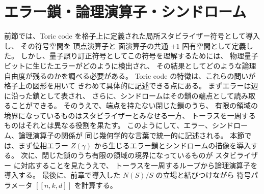 \documentclass[../master.tex]{subfiles}
\begin{document}
\section{エラー鎖・論理演算子・シンドローム}

前節では、Toric code を格子上に定義された局所スタビライザー符号として導入し、
その符号空間を 頂点演算子と 面演算子の共通 \(+1\) 固有空間として定義した。
しかし、量子誤り訂正符号としてこの符号を理解するためには、
物理量子ビットに生じたエラーがどのように検出され、
その結果としてどのような論理自由度が残るのかを調べる必要がある。
Toric code の特徴は、これらの問いが格子上の図形を用いて
きわめて具体的に記述できる点にある。
まずエラーは辺に沿った鎖として表され、
さらに、シンドロームはその鎖の端点として読み取ることができる。
そのうえで、端点を持たない閉じた鎖のうち、
有限の領域の境界になっているものはスタビライザーとみなせる一方、
トーラスを一周するものはそれとは異なる役割を果たす。
このようにして、エラー、シンドローム、論理演算子の関係が
同じ幾何学的な言葉で統一的に記述される。
本節では、まず位相エラー \(Z(\gamma)\) から生じるエラー鎖とシンドロームの描像を導入する。
次に、閉じた鎖のうち有限の領域の境界になっているものが スタビライザー に対応することを見たうえで、
トーラスを一周するループから論理演算子を導入する。
最後に、前章で導入した \(N(S)/S\) の立場と結びつけながら
符号パラメータ \([[n,k,d]]\) を計算する。
\end{document}
